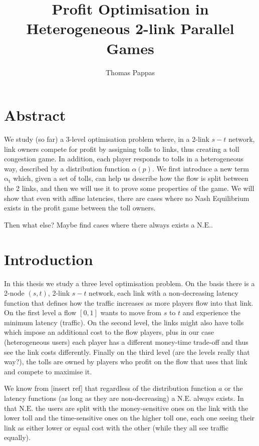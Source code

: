 \documentclass[a4paper,11pt]{article}
\newcommand{\at}{\mathrm{\alpha_t}}
\newcommand{\NE}{\mathrm{N.E.}}
\begin{document}
\title{Profit Optimisation in Heterogeneous 2-link Parallel Games}
\author{Thomas Pappas}
\date{}
\maketitle

\section*{Abstract}
We study (so far) a 3-level optimisation problem where, in a 2-link $s-t$ network, link owners compete for profit by assigning tolls to links, thus creating a toll congestion game.
In addition, each player responds to tolls in a heterogeneous way, described by a distribution function $\alpha(p)$.
We first introduce a new term $\at$ which, given a set of tolls, can help us describe how the flow is split between the 2 links, and then we will use it to prove some properties of the game.
We will show that even with affine latencies, there are cases where no Nash Equilibrium exists in the profit game between the toll owners.

Then what else? Maybe find cases where there always exists a $\NE$.


\section{Introduction}

In this thesis we study a three level optimisation problem.
On the basis there is a 2-node $(s, t)$, 2-link $s-t$ network, each link with a non-decreasing latency function that defines how the traffic increases as more players flow into that link.
On the first level a flow $[0, 1]$ wants to move from $s$ to $t$ and experience the minimum latency (traffic).
On the second level, the links might also have tolls which impose an additional cost to the flow players, plus in our case (heterogeneous users) each player has a different money-time trade-off and thus see the link costs differently.
Finally on the third level (are the levels really that way?), the tolls are owned by players who profit on the flow that uses that link and compete to maximise it.

We know from [insert ref] that regardless of the distribution function $a$ or the latency functions (as long as they are non-decreasing) a $\NE$ always exists.
In that $\NE$ the users are split with the money-sensitive ones on the link with the lower toll and the time-sensitive ones on the higher toll one, each one seeing their link as either lower or equal cost with the other (while they all see traffic equally).
\end{document}

